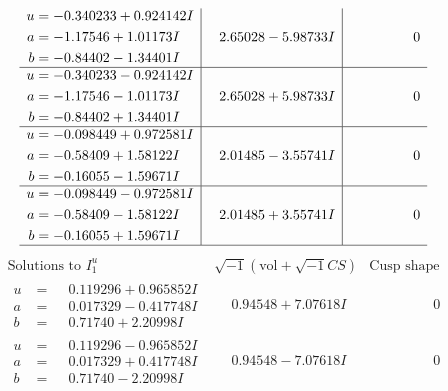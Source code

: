 \documentclass[1p]{elsarticle_modified}
\theoremstyle{definition}
\newcommand{\I}{\sqrt{-1}}
\begin{document}
$$\begin{array}{c|c|c}
\begin{aligned}
u &= -0.340233 + 0.924142 I \\
a &= -1.17546 + 1.01173 I \\
b &= -0.84402 - 1.34401 I\end{aligned}
 & \phantom{-}2.65028 - 5.98733 I & \phantom{-0.000000 } 0 \\ \hline\begin{aligned}
u &= -0.340233 - 0.924142 I \\
a &= -1.17546 - 1.01173 I \\
b &= -0.84402 + 1.34401 I\end{aligned}
 & \phantom{-}2.65028 + 5.98733 I & \phantom{-0.000000 } 0 \\ \hline\begin{aligned}
u &= -0.098449 + 0.972581 I \\
a &= -0.58409 + 1.58122 I \\
b &= -0.16055 - 1.59671 I\end{aligned}
 & \phantom{-}2.01485 - 3.55741 I & \phantom{-0.000000 } 0 \\ \hline\begin{aligned}
u &= -0.098449 - 0.972581 I \\
a &= -0.58409 - 1.58122 I \\
b &= -0.16055 + 1.59671 I\end{aligned}
 & \phantom{-}2.01485 + 3.55741 I & \phantom{-0.000000 } 0\\
 \hline 
 \end{array}$$\newpage$$\begin{array}{c|c|c}  
\text{Solutions to }I^u_{1}& \I (\text{vol} + \sqrt{-1}CS) & \text{Cusp shape}\\
 \hline 
\begin{aligned}
u &= \phantom{-}0.119296 + 0.965852 I \\
a &= \phantom{-}0.017329 - 0.417748 I \\
b &= \phantom{-}0.71740 + 2.20998 I\end{aligned}
 & \phantom{-}0.94548 + 7.07618 I & \phantom{-0.000000 } 0 \\ \hline\begin{aligned}
u &= \phantom{-}0.119296 - 0.965852 I \\
a &= \phantom{-}0.017329 + 0.417748 I \\
b &= \phantom{-}0.71740 - 2.20998 I\end{aligned}
 & \phantom{-}0.94548 - 7.07618 I & \phantom{-0.000000 } 0 \\ \hline\begin{aligned}

\end{aligned}
\end{array}$$
\end{document}
